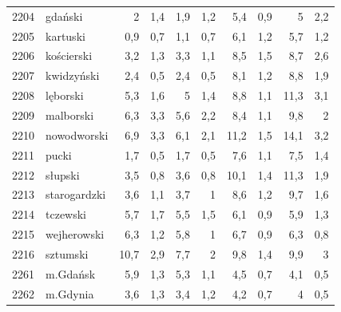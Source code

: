 \begin{center}
\begin{longtable}{lp{3cm}rrrrrrrr}
2204 & gdański                 & 2       & 1,4         & 1,9      & 1,2          & 5,4      & 0,9          & 5        & 2,2          \\
2205 & kartuski                & 0,9     & 0,7         & 1,1      & 0,7          & 6,1      & 1,2          & 5,7      & 1,2          \\
2206 & kościerski              & 3,2     & 1,3         & 3,3      & 1,1          & 8,5      & 1,5          & 8,7      & 2,6          \\
2207 & kwidzyński              & 2,4     & 0,5         & 2,4      & 0,5          & 8,1      & 1,2          & 8,8      & 1,9          \\
2208 & lęborski                & 5,3     & 1,6         & 5        & 1,4          & 8,8      & 1,1          & 11,3     & 3,1          \\
2209 & malborski               & 6,3     & 3,3         & 5,6      & 2,2          & 8,4      & 1,1          & 9,8      & 2            \\
2210 & nowodworski             & 6,9     & 3,3         & 6,1      & 2,1          & 11,2     & 1,5          & 14,1     & 3,2          \\
2211 & pucki                   & 1,7     & 0,5         & 1,7      & 0,5          & 7,6      & 1,1          & 7,5      & 1,4          \\
2212 & słupski                 & 3,5     & 0,8         & 3,6      & 0,8          & 10,1     & 1,4          & 11,3     & 1,9          \\
2213 & starogardzki            & 3,6     & 1,1         & 3,7      & 1            & 8,6      & 1,2          & 9,7      & 1,6          \\
2214 & tczewski                & 5,7     & 1,7         & 5,5      & 1,5          & 6,1      & 0,9          & 5,9      & 1,3          \\
2215 & wejherowski             & 6,3     & 1,2         & 5,8      & 1            & 6,7      & 0,9          & 6,3      & 0,8          \\
2216 & sztumski                & 10,7    & 2,9         & 7,7      & 2            & 9,8      & 1,4          & 9,9      & 3            \\
2261 & m.Gdańsk                & 5,9     & 1,3         & 5,3      & 1,1          & 4,5      & 0,7          & 4,1      & 0,5          \\
2262 & m.Gdynia                & 3,6     & 1,3         & 3,4      & 1,2          & 4,2      & 0,7          & 4        & 0,5          \\

\end{longtable}
\end{center}
